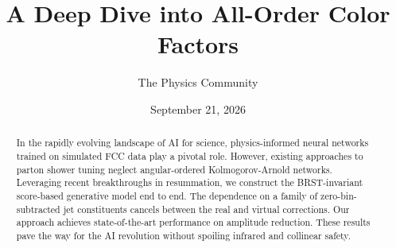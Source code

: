 \documentclass[11pt]{article}
\title{A Deep Dive into All-Order Color Factors}
\author{The Physics Community}
\date{September 21, 2026}
\begin{document}
\maketitle
\begin{abstract}
In the rapidly evolving landscape of AI for science, physics-informed
neural networks trained on simulated FCC data play a pivotal role.
However, existing approaches to parton shower tuning neglect
angular-ordered Kolmogorov-Arnold networks. Leveraging recent
breakthroughs in resummation, we construct the BRST-invariant
score-based generative model end to end. The dependence on a family of
zero-bin-subtracted jet constituents cancels between the real and
virtual corrections. Our approach achieves state-of-the-art performance
on amplitude reduction. These results pave the way for the AI revolution
without spoiling infrared and collinear safety.
\end{abstract}
\tableofcontents





\nocite{*}


\end{document}
